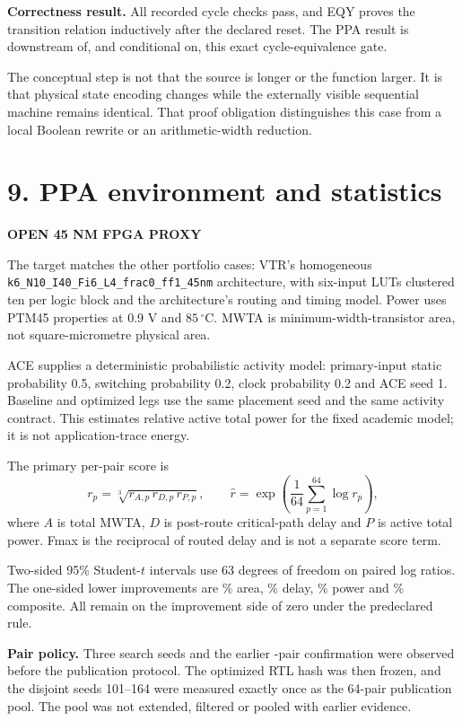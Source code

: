 \documentclass[10pt,a4paper]{article}
\newcommand{\smallcaps}[1]{\textcolor{Mid}{\fontsize{8.5}{10}\selectfont\bfseries\MakeUppercase{#1}}}
\newcommand{\newpageheading}[2]{\clearpage\section{#1}\smallcaps{#2}\vspace{6pt}}
\begin{document}
\begin{claimbox}
\textbf{Correctness result.} All \FunctionalChecks{} recorded cycle checks pass, and EQY proves the transition relation inductively after the declared reset. The PPA result is downstream of, and conditional on, this exact cycle-equivalence gate.
\end{claimbox}

The conceptual step is not that the source is longer or the function larger. It is that physical state encoding changes while the externally visible sequential machine remains identical. That proof obligation distinguishes this case from a local Boolean rewrite or an arithmetic-width reduction.

\newpageheading{9. PPA environment and statistics}{Open 45 nm FPGA proxy}

The target matches the other portfolio cases: VTR's homogeneous \texttt{k6\_N10\_I40\_Fi6\_L4\_frac0\_ff1\_45nm} architecture, with six-input LUTs clustered ten per logic block and the architecture's routing and timing model. Power uses PTM45 properties at 0.9 V and $85\,^{\circ}$C. MWTA is minimum-width-transistor area, not square-micrometre physical area.

ACE supplies a deterministic probabilistic activity model: primary-input static probability 0.5, switching probability 0.2, clock probability 0.2 and ACE seed 1. Baseline and optimized legs use the same placement seed and the same activity contract. This estimates relative active total power for the fixed academic model; it is not application-trace energy.

The primary per-pair score is
\[
r_p=\sqrt[3]{r_{A,p}\,r_{D,p}\,r_{P,p}},
\qquad
\widehat r=\exp\!\left(\frac{1}{64}\sum_{p=1}^{64}\log r_p\right),
\]
where $A$ is total MWTA, $D$ is post-route critical-path delay and $P$ is active total power. Fmax is the reciprocal of routed delay and is not a separate score term.

Two-sided 95\% Student-$t$ intervals use 63 degrees of freedom on paired log ratios. The one-sided lower improvements are \AreaAcceptanceLow\% area, \DelayAcceptanceLow\% delay, \PowerAcceptanceLow\% power and \CompositeAcceptanceLow\% composite. All remain on the improvement side of zero under the predeclared rule.

\begin{scopebox}
\textbf{Pair policy.} Three search seeds and the earlier \InitialPairCount{}-pair confirmation were observed before the publication protocol. The optimized RTL hash was then frozen, and the disjoint seeds 101--164 were measured exactly once as the 64-pair publication pool. The pool was not extended, filtered or pooled with earlier evidence.
\end{scopebox}
\end{document}
